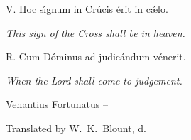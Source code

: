 \endlyrics

\medskip

\s V. Hoc s\'\i gnum in Cr\'ucis \'erit in c\'\ae lo.

{\hskip20mm \it This sign of the Cross shall be in heaven.}

\s R. Cum D\'ominus ad judic\'andum v\'enerit.

{\hskip20mm \it When the Lord shall come to judgement.}

\bigskip

\source Venantius Fortunatus {}--

\source Translated by W.~K.~Blount, d.~{}




